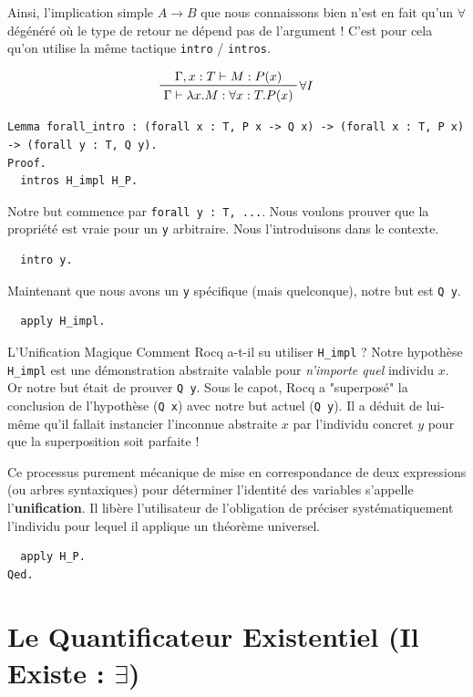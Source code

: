 \documentclass[11pt,a4paper]{article}
\begin{document}
Ainsi, l'implication simple $A \to B$ que nous connaissons bien n'est en fait qu'un $\forall$ dégénéré où le type de retour ne dépend pas de l'argument ! C'est pour cela qu'on utilise la même tactique \texttt{intro} / \texttt{intros}.

$$\prftree[r]{${\forall}I$}{\Gamma, x : T \vdash M : P(x)}{\Gamma \vdash \lambda x. M : \forall x : T. P(x)}$$

\begin{lstlisting}
Lemma forall_intro : (forall x : T, P x -> Q x) -> (forall x : T, P x) -> (forall y : T, Q y).
Proof.
  intros H_impl H_P.
\end{lstlisting}

Notre but commence par \texttt{forall y : T, ...}. Nous voulons prouver que la propriété est vraie pour un \texttt{y} arbitraire. Nous l'introduisons dans le contexte.

\begin{lstlisting}
  intro y.
\end{lstlisting}

Maintenant que nous avons un \texttt{y} spécifique (mais quelconque), notre but est \texttt{Q y}.

\begin{lstlisting}
  apply H_impl.
\end{lstlisting}

\begin{remarque}{L'Unification Magique}{}
  Comment Rocq a-t-il su utiliser \texttt{H\_impl} ? Notre hypothèse \texttt{H\_impl} est une démonstration abstraite valable pour \textit{n'importe quel} individu $x$. Or notre but était de prouver \texttt{Q y}. Sous le capot, Rocq a "superposé" la conclusion de l'hypothèse (\texttt{Q x}) avec notre but actuel (\texttt{Q y}). Il a déduit de lui-même qu'il fallait instancier l'inconnue abstraite $x$ par l'individu concret $y$ pour que la superposition soit parfaite !

  Ce processus purement mécanique de mise en correspondance de deux expressions (ou arbres syntaxiques) pour déterminer l'identité des variables s'appelle l'\textbf{unification}. Il libère l'utilisateur de l'obligation de préciser systématiquement l'individu pour lequel il applique un théorème universel.
\end{remarque}

\begin{lstlisting}
  apply H_P.
Qed.
\end{lstlisting}

\section{Le Quantificateur Existentiel (Il Existe : $\exists$)}
\end{document}

